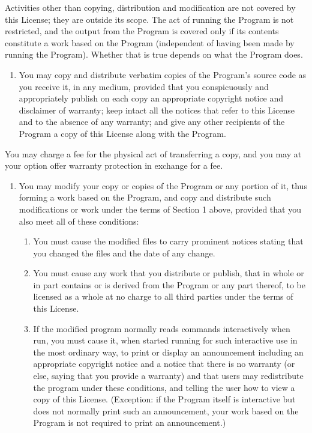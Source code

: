\documentclass[letterpaper,10pt,english]{sphinxmanual}
\begin{document}
\sphinxAtStartPar
Activities other than copying, distribution and modification are not covered by this License; they are outside its scope. The act of running the Program is not restricted, and the output from the Program is covered only if its contents constitute a work based on the Program (independent of having been made by running the Program). Whether that is true depends on what the Program does.
\begin{enumerate}
%
\item {} 
\sphinxAtStartPar
You may copy and distribute verbatim copies of the Program’s source code as you receive it, in any medium, provided that you conspicuously and appropriately publish on each copy an appropriate copyright notice and disclaimer of warranty; keep intact all the notices that refer to this License and to the absence of any warranty; and give any other recipients of the Program a copy of this License along with the Program.

\end{enumerate}

\sphinxAtStartPar
You may charge a fee for the physical act of transferring a copy, and you may at your option offer warranty protection in exchange for a fee.
\begin{enumerate}
%
\setcounter{enumi}{1}
\item {} 
\sphinxAtStartPar
You may modify your copy or copies of the Program or any portion of it, thus forming a work based on the Program, and copy and distribute such modifications or work under the terms of Section 1 above, provided that you also meet all of these conditions:
\begin{enumerate}
%
\item {} 
\sphinxAtStartPar
You must cause the modified files to carry prominent notices stating that you changed the files and the date of any change.

\item {} 
\sphinxAtStartPar
You must cause any work that you distribute or publish, that in whole or in part contains or is derived from the Program or any part thereof, to be licensed as a whole at no charge to all third parties under the terms of this License.

\item {} 
\sphinxAtStartPar
If the modified program normally reads commands interactively when run, you must cause it, when started running for such interactive use in the most ordinary way, to print or display an announcement including an appropriate copyright notice and a notice that there is no warranty (or else, saying that you provide a warranty) and that users may redistribute the program under these conditions, and telling the user how to view a copy of this License. (Exception: if the Program itself is interactive but does not normally print such an announcement, your work based on the Program is not required to print an announcement.)

\end{enumerate}

\end{enumerate}
\end{document}
